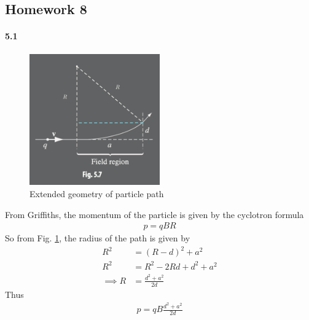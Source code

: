 \documentclass[../main.tex]{subfiles}
\begin{document}
\pagestyle{fancy}

\begin{center}
    \section*{Homework 8}
\end{center}

\paragraph{5.1} %
\begin{figure}[ht]
    \centering
    \includegraphics[width=0.5\textwidth]{hw8_1.png}
    \caption{Extended geometry of particle path}
    \label{fig:hw8_1}
\end{figure}
From Griffiths, the momentum of the particle is given by the cyclotron formula
\begin{align*}\tag{5.3}\label{eq:5.3}
    p = qBR
\end{align*}
So from Fig. \ref{fig:hw8_1}, the radius of the path is given by
\begin{align*}
    R^2 &= (R - d)^2 + a^2 \\
    R^2 &= R^2 - 2Rd + d^2 + a^2 \\
    \implies R &= \frac{d^2 + a^2}{2d}
\end{align*}
Thus
\begin{align*}
    \boxed{
        p = qB\frac{d^2 + a^2}{2d} 
    }
\end{align*}

\newpage
\end{document}
